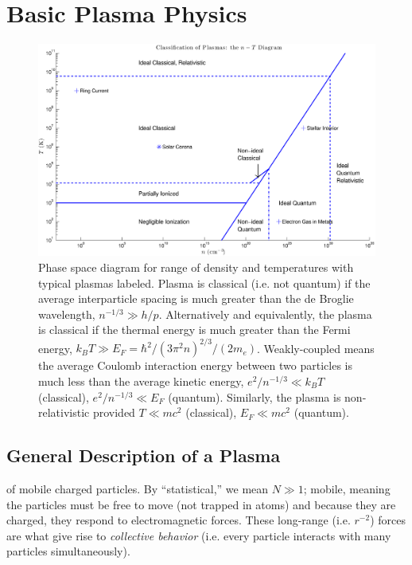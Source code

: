\chapter{Basic Plasma Physics}

\begin{figure}
\centering
\includegraphics[width=\columnwidth]{figures/nT_diagram.eps}
\caption{Phase space diagram for range of density and temperatures with typical plasmas labeled. Plasma is classical (i.e. not quantum) if the average interparticle spacing is much greater than the de Broglie wavelength, $n^{-1/3}\gg h/p$. Alternatively and equivalently, the plasma is classical if the thermal energy is much greater than the Fermi energy, $k_BT\gg E_F=\hbar^2/(3\pi^2n)^{2/3}/(2m_e)$. Weakly-coupled means the average Coulomb interaction energy between two particles is much less than the average kinetic energy, $e^2/n^{-1/3}\ll k_BT$ (classical), $e^2/n^{-1/3}\ll E_F$ (quantum). Similarly, the plasma is non-relativistic provided $T\ll mc^2$ (classical), $E_F\ll mc^2$ (quantum). }
\end{figure}

\section{General Description of a Plasma} 

 of mobile charged particles. By ``statistical,'' we mean $N\gg1$; mobile, meaning the particles must be free to move (not trapped in atoms) and because they are charged, they respond to electromagnetic forces. These long-range (i.e. $r^{-2}$) forces are what give rise to \textit{collective behavior} (i.e. every particle interacts with many particles simultaneously).

